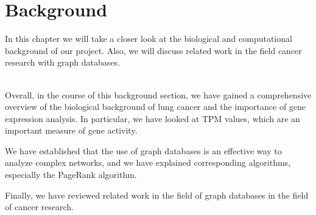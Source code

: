 \section{Background} \label{sec:background}
In this chapter we will take a closer look at the biological and computational background of our project.
Also, we will discuss related work in the field cancer research with graph databases.






\\


Overall, in the course of this background section,
we have gained a comprehensive overview of the biological background of lung cancer and
the importance of gene expression analysis.
In particular, we have looked at TPM values, which are an important measure of gene activity.

We have established that the use of graph databases is an effective way to analyze complex networks,
and we have explained corresponding algorithms, especially the PageRank algorithm.

Finally, we have reviewed related work in the field of graph databases in the field of cancer research.
